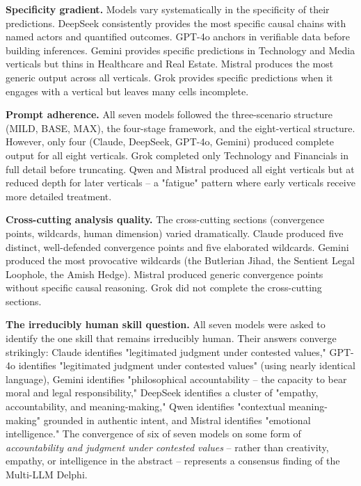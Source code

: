 \documentclass{article}
\begin{document}
\textbf{Specificity gradient.} Models vary systematically in the specificity of their predictions. DeepSeek consistently provides the most specific causal chains with named actors and quantified outcomes. GPT-4o anchors in verifiable data before building inferences. Gemini provides specific predictions in Technology and Media verticals but thins in Healthcare and Real Estate. Mistral produces the most generic output across all verticals. Grok provides specific predictions when it engages with a vertical but leaves many cells incomplete.

\textbf{Prompt adherence.} All seven models followed the three-scenario structure (MILD, BASE, MAX), the four-stage framework, and the eight-vertical structure. However, only four (Claude, DeepSeek, GPT-4o, Gemini) produced complete output for all eight verticals. Grok completed only Technology and Financials in full detail before truncating. Qwen and Mistral produced all eight verticals but at reduced depth for later verticals -- a "fatigue" pattern where early verticals receive more detailed treatment.

\textbf{Cross-cutting analysis quality.} The cross-cutting sections (convergence points, wildcards, human dimension) varied dramatically. Claude produced five distinct, well-defended convergence points and five elaborated wildcards. Gemini produced the most provocative wildcards (the Butlerian Jihad, the Sentient Legal Loophole, the Amish Hedge). Mistral produced generic convergence points without specific causal reasoning. Grok did not complete the cross-cutting sections.

\textbf{The irreducibly human skill question.} All seven models were asked to identify the one skill that remains irreducibly human. Their answers converge strikingly: Claude identifies "legitimated judgment under contested values," GPT-4o identifies "legitimated judgment under contested values" (using nearly identical language), Gemini identifies "philosophical accountability -- the capacity to bear moral and legal responsibility," DeepSeek identifies a cluster of "empathy, accountability, and meaning-making," Qwen identifies "contextual meaning-making" grounded in authentic intent, and Mistral identifies "emotional intelligence." The convergence of six of seven models on some form of \textit{accountability and judgment under contested values} -- rather than creativity, empathy, or intelligence in the abstract -- represents a consensus finding of the Multi-LLM Delphi.
\end{document}
